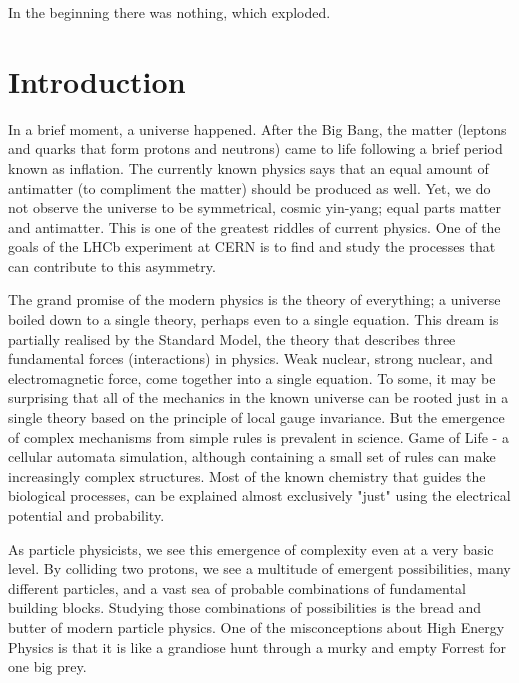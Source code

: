 \begin{savequote}[75mm]
In the beginning there was nothing, which exploded.
\end{savequote}

\chapter{Introduction}
\label{introduction}

In a brief moment, a universe happened.
After the Big Bang, the matter (leptons and quarks that form protons and neutrons) came to life following a brief period known as inflation.
The currently known physics says that an equal amount of antimatter (to compliment the matter) should be produced as well.
Yet, we do not observe the universe to be symmetrical, cosmic yin-yang; equal parts matter and antimatter.
This is one of the greatest riddles of current physics.
One of the goals of the LHCb experiment at CERN is to find and study the processes that can contribute to this asymmetry.

The grand promise of the modern physics is the theory of everything; a universe boiled down to a single theory, perhaps even to a single equation.
This dream is partially realised by the Standard Model, the theory that describes three fundamental forces (interactions) in physics.
Weak nuclear, strong nuclear, and electromagnetic force, come together into a single equation.
To some, it may be surprising that all of the mechanics in the known universe can be rooted just in a single theory based on the principle of local gauge invariance.
But the emergence of complex mechanisms from simple rules is prevalent in science.
Game of Life - a cellular automata simulation, although containing a small set of rules can make increasingly complex structures.
Most of the known chemistry that guides the biological processes, can be explained almost exclusively "just" using the electrical potential and probability.

As particle physicists, we see this emergence of complexity even at a very basic level.
By colliding two protons, we see a multitude of emergent possibilities, many different particles, and a vast sea of probable combinations of fundamental building blocks.
Studying those combinations of possibilities is the bread and butter of modern particle physics.
One of the misconceptions about High Energy Physics is that it is like a grandiose hunt through a murky and empty Forrest for one big prey.

